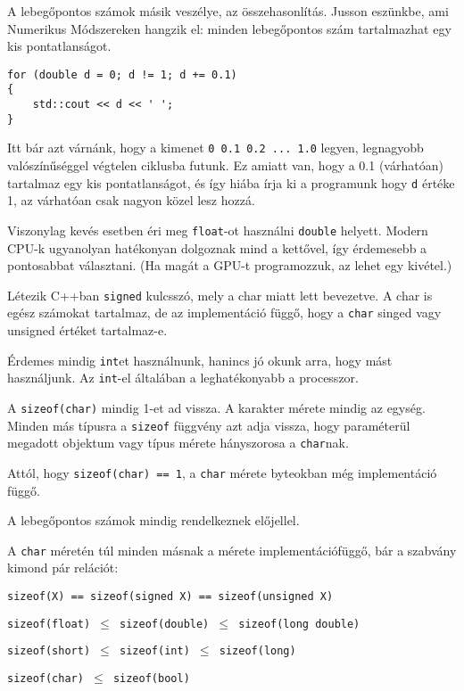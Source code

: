 \documentclass[a4paper,11.5pt,table]{article}
\begin{document}
	\smallskip
	A lebegőpontos számok másik veszélye, az összehasonlítás. Jusson eszünkbe, ami Numerikus Módszereken hangzik el: minden lebegőpontos szám tartalmazhat egy kis pontatlanságot.
	\begin{lstlisting}
for (double d = 0; d != 1; d += 0.1)
{
	std::cout << d << ' ';
}
	\end{lstlisting}
	Itt bár azt várnánk, hogy a kimenet \texttt{0 0.1 0.2 ... 1.0} legyen, legnagyobb valószínűséggel végtelen ciklusba futunk. Ez amiatt van, hogy a 0.1 (várhatóan) tartalmaz egy kis pontatlanságot, és így hiába írja ki  a programunk hogy \texttt{d} értéke 1, az várhatóan csak nagyon közel lesz hozzá.
	\begin{note}
		Viszonylag kevés esetben éri meg \texttt{float}-ot használni \texttt{double} helyett. Modern CPU-k ugyanolyan hatékonyan dolgoznak mind a kettővel, így érdemesebb a pontosabbat választani. (Ha magát a GPU-t programozzuk, az lehet egy kivétel.)
	\end{note}
	
	Létezik C++ban \texttt{signed} kulcsszó, mely a char miatt lett bevezetve. A char is egész számokat tartalmaz, de az implementáció függő, hogy a \texttt{char} singed vagy unsigned értéket tartalmaz-e. 
	\begin{note}
		Érdemes mindig \texttt{int}et használnunk, hanincs jó okunk arra, hogy mást használjunk. Az \texttt{int}-el általában a leghatékonyabb a processzor.
	\end{note}
	A \texttt{sizeof(char)} mindig 1-et ad vissza. A karakter mérete mindig az egység. Minden más típusra a \texttt{sizeof} függvény azt adja vissza, hogy paraméterül megadott objektum vagy típus mérete hányszorosa a \texttt{char}nak. 
	
  Attól, hogy \texttt{sizeof(char) == 1}, a \texttt{char} mérete byteokban még implementáció függő.

  A lebegőpontos számok mindig rendelkeznek előjellel. 
	
	\medskip
	A \texttt{char} méretén túl minden másnak a mérete implementációfüggő, bár a szabvány kimond pár relációt:
	\begin{center}
		\texttt{sizeof(X) == sizeof(signed X) == sizeof(unsigned X)}
		\smallskip
		
		\texttt{sizeof(float) $\leq$ sizeof(double) $\leq$ sizeof(long double)}
		\smallskip
		
		\texttt{sizeof(short) $\leq$ sizeof(int) $\leq$ sizeof(long)}
		\smallskip
		
		\texttt{sizeof(char) $\leq$ sizeof(bool)}
		\smallskip
	\end{center}
\end{document}
